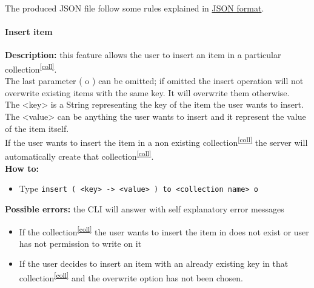\documentclass{scalatekids-article}
\begin{document}
The produced JSON file follow some rules explained in \hyperref[sec:JSONFormat]{JSON format}.

\paragraph{Insert item}
\label{sec:insertitem}
\textbf{Description:} this feature allows the user to insert an item in a particular collection\textsuperscript{\ref{coll}}.\\
The last parameter ( o ) can be omitted; if omitted the insert operation will not overwrite existing items with the same key. It will overwrite them otherwise. \\
The <key> is a String representing the key of the item the user wants to insert.\\
The <value> can be anything the user wants to insert and it represent the value of the item itself.\\
If the user wants to insert the item in a non existing collection\textsuperscript{\ref{coll}} the server
will automatically create that collection\textsuperscript{\ref{coll}}.\\
\textbf{How to:}
\begin{itemize}
\item Type \texttt{insert ( <key> -> <value> ) to <collection name> o}
\end{itemize}
\textbf{Possible errors:} the CLI will answer with self explanatory error messages
\begin{itemize}
\item If the collection\textsuperscript{\ref{coll}} the user wants to insert the item in does not exist or user has not permission to write on it
\item If the user decides to insert an item with an already existing key in that collection\textsuperscript{\ref{coll}} and the overwrite option has not been chosen.
\end{itemize}
\end{document}
